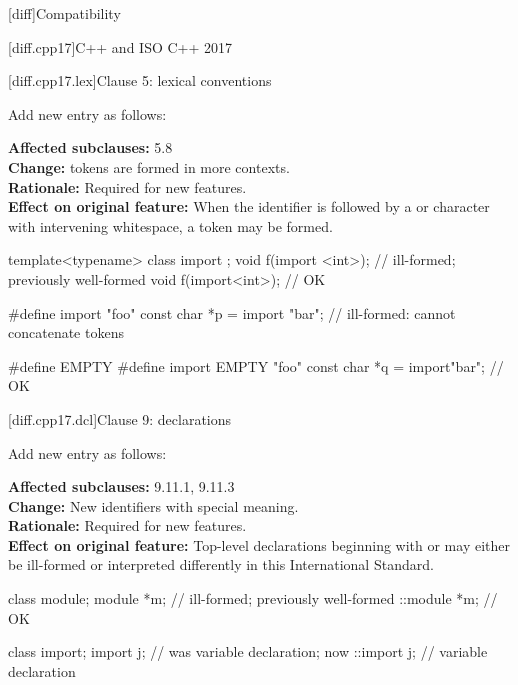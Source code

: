 \setcounter{chapter}{2}
[diff]{Compatibility}%

\setcounter{section}{4}
[diff.cpp17]{C++ and ISO C++ 2017}%

\setcounter{subsection}{0}
[diff.cpp17.lex]{Clause 5: lexical conventions}%

\noindent
Add new entry as follows:
\begin{std.txt}
\color{addclr}
\textbf{Affected subclauses:} 5.8\\
\textbf{Change:}  tokens are formed in more contexts.\\
\textbf{Rationale:} Required for new features.\\
\textbf{Effect on original feature:}
When the identifier 
is followed by a \tcode{<} or  character
with intervening whitespace,
a  token may be formed.
\begin{example}
\begin{codeblock}
template<typename> class import {};
void f(import <int>);           // ill-formed; previously well-formed
void f(import<int>);            // OK

#define import "foo"
const char *p = import "bar";   // ill-formed: cannot concatenate  tokens

#define EMPTY
#define import EMPTY "foo"
const char *q = import"bar";    // OK
\end{codeblock}
\end{example}
\end{std.txt}

\setcounter{subsection}{2}
[diff.cpp17.dcl]{Clause 9: declarations}%

\noindent
Add new entry as follows:
\begin{std.txt}
\color{addclr}
\textbf{Affected subclauses:} 9.11.1, 9.11.3\\
\textbf{Change:} New identifiers with special meaning.\\
\textbf{Rationale:} Required for new features.\\
\textbf{Effect on original feature:}
Top-level declarations beginning with
 or  may
either be ill-formed or interpreted differently
in this International Standard.
\begin{example}
\begin{codeblock}
class module;
module *m;        // ill-formed; previously well-formed
::module *m;      // OK

class import;
import j;         // was variable declaration; now 
::import j;       // variable declaration
\end{codeblock}
\end{example}
\end{std.txt}
